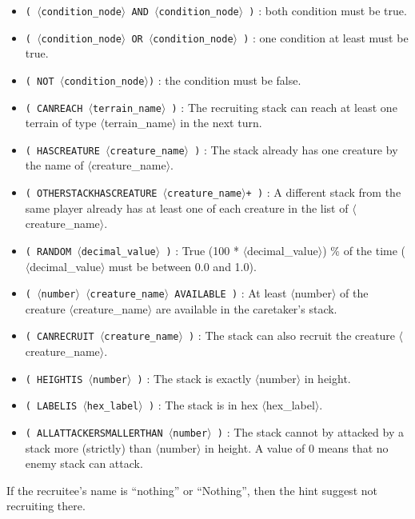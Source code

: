 \documentclass{article}
\begin{document}
\begin{itemize}
\item \texttt{( $\langle$condition\_node$\rangle$ AND $\langle$condition\_node$\rangle$ )} : both condition must be true.
\item \texttt{( $\langle$condition\_node$\rangle$ OR $\langle$condition\_node$\rangle$ )} : one condition at least must be true.
\item \texttt{( NOT $\langle$condition\_node$\rangle$)} : the condition must be false.
\item \texttt{( CANREACH $\langle$terrain\_name$\rangle$ )} : The recruiting stack can reach at least one terrain of type $\langle$terrain\_name$\rangle$ in the next turn.
\item \texttt{( HASCREATURE $\langle$creature\_name$\rangle$ )} : The stack already has one creature by the name of $\langle$creature\_name$\rangle$.
\item \texttt{( OTHERSTACKHASCREATURE $\langle$creature\_name$\rangle$+ )} : A different stack from the same player already has at least one of each creature in the list of $\langle$creature\_name$\rangle$.
\item \texttt{( RANDOM $\langle$decimal\_value$\rangle$ )} : True (100 * $\langle$decimal\_value$\rangle$) \% of the time ($\langle$decimal\_value$\rangle$ must be between 0.0 and 1.0).
\item \texttt{( $\langle$number$\rangle$ $\langle$creature\_name$\rangle$ AVAILABLE )} : At least $\langle$number$\rangle$ of the creature $\langle$creature\_name$\rangle$ are available in the caretaker's stack.
\item \texttt{( CANRECRUIT $\langle$creature\_name$\rangle$ )} : The stack can also recruit the creature $\langle$creature\_name$\rangle$.
\item \texttt{( HEIGHTIS $\langle$number$\rangle$ )} : The stack is exactly $\langle$number$\rangle$ in height.
\item \texttt{( LABELIS $\langle$hex\_label$\rangle$ )} : The stack is in hex $\langle$hex\_label$\rangle$.
\item \texttt{( ALLATTACKERSMALLERTHAN $\langle$number$\rangle$ )} : The stack cannot by attacked by a stack more (strictly) than $\langle$number$\rangle$ in height. A value of 0 means that no enemy stack can attack.
\end{itemize}

If the recruitee's name is ``nothing'' or ``Nothing'', then the hint suggest not recruiting there.
\end{document}
